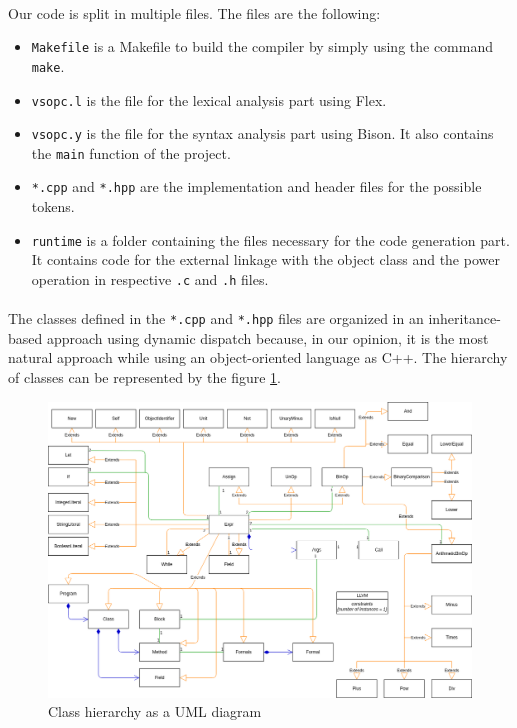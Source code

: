 \documentclass[a4paper, 11pt, oneside]{article}
\begin{document}
\paragraph{}Our code is split in multiple files. The files are the following:
\begin{itemize}
	\item \texttt{Makefile} is a Makefile to build the compiler by simply using the command \texttt{make}.
	\item \texttt{vsopc.l} is the file for the lexical analysis part using Flex.
	\item \texttt{vsopc.y} is the file for the syntax analysis part using Bison. It also contains the \texttt{main} function of the project.
	\item \texttt{*.cpp} and \texttt{*.hpp} are the implementation and header files for the possible tokens.
 	\item \texttt{runtime} is a folder containing the files necessary for the code generation part. It contains code for the external linkage with the object class and the power operation in respective \texttt{.c} and \texttt{.h} files.
\end{itemize}

\paragraph{}The classes defined in the \texttt{*.cpp} and \texttt{*.hpp} files are organized in an inheritance-based approach using dynamic dispatch because, in our opinion, it is the most natural approach while using an object-oriented language as C++. The hierarchy of classes can be represented by the figure \ref{classHierarchy}.
\begin{figure}
\centering
\includegraphics[scale=0.35]{uml.png}
\caption{Class hierarchy as a UML diagram}
\label{classHierarchy}
\end{figure}
\end{document}
